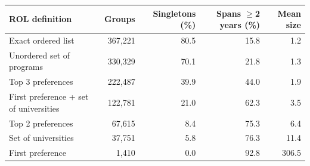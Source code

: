 \begin{tabular}{lrrrr}
\toprule
ROL definition & Groups & Singletons (\%) & Spans \(\geq\)2 years (\%) & Mean size \\
\midrule
Exact ordered list &   367,221 &  80.5 &  15.8 &    1.2 \\
Unordered set of programs &   330,329 &  70.1 &  21.8 &    1.3 \\
Top 3 preferences &   222,487 &  39.9 &  44.0 &    1.9 \\
First preference + set of universities &   122,781 &  21.0 &  62.3 &    3.5 \\
Top 2 preferences &    67,615 &   8.4 &  75.3 &    6.4 \\
Set of universities &    37,751 &   5.8 &  76.3 &   11.4 \\
First preference &     1,410 &   0.0 &  92.8 &  306.5 \\
\bottomrule
\end{tabular}
